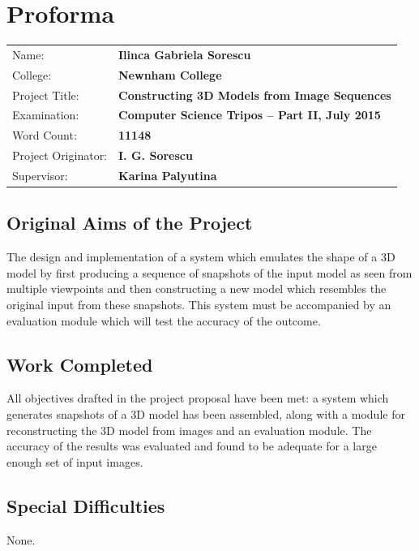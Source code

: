 \documentclass[12pt,a4paper,twoside,openright]{report}
\begin{document}

\pagestyle{plain}

\chapter*{Proforma}

{\large
\begin{tabular}{ll}
Name:               & \bf Ilinca Gabriela Sorescu                       \\
College:            & \bf Newnham College                               \\
Project Title:      & \bf Constructing 3D Models from Image Sequences   \\
Examination:        & \bf Computer Science Tripos -- Part II, July 2015  \\
Word Count:         & \bf 11148 \\
Project Originator: & \bf I. G. Sorescu                     \\
Supervisor:         & \bf Karina Palyutina                  \\ 
\end{tabular}
}



\section*{Original Aims of the Project}
The design and implementation of a system which emulates the shape of a 3D model by first producing a sequence of snapshots of the input model as seen from multiple viewpoints and then constructing a new model which resembles the original input from these snapshots. This system must be accompanied by an evaluation module which will test the accuracy of the outcome.


\section*{Work Completed}
All objectives drafted in the project proposal have been met: a system which generates snapshots of a 3D model has been assembled, along with a module for reconstructing the 3D model from images and an evaluation module. The accuracy of the results was evaluated and found to be adequate for a large enough set of input images.  

\section*{Special Difficulties}
None.
\end{document}

